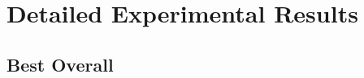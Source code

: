 \documentclass{article}
\begin{document}
\newpage


\newpage
\appendix

\section{Detailed Experimental Results}
\label{app:detailed_results}

\subsection{Best Overall}
\label{app:results_best}
\end{document}
